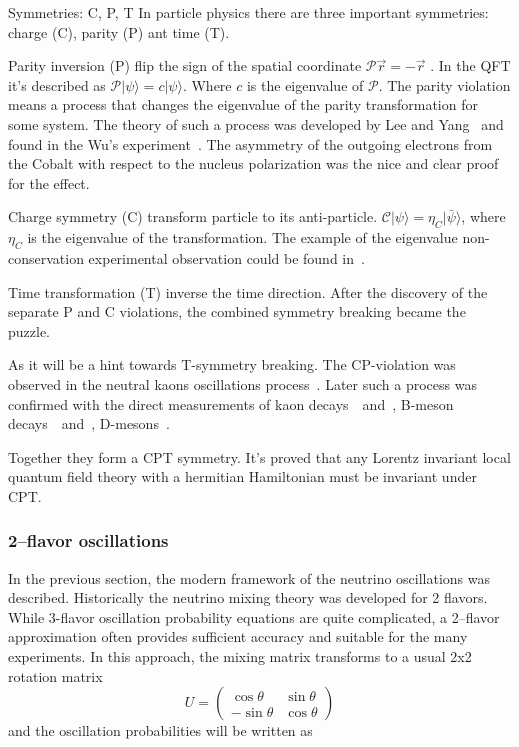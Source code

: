\documentclass[../main.tex]{subfiles}
\begin{document}
\begin{bclogo}[couleur=blue!2, arrondi=0.1, logo=\bcinfo, nobreak=true]{Symmetries: C, P, T}
In particle physics there are three important symmetries: charge (C), parity (P) ant time (T).

Parity inversion (P) flip the sign of the spatial coordinate $\mathcal{P}\overrightarrow{r}=-\overrightarrow{r}$ . In the QFT it's described as $\mathcal{P}\lvert\psi\rangle=c\lvert\psi\rangle$. Where $c$ is the eigenvalue of $\mathcal{P}$. The parity violation means a process that changes the eigenvalue of the parity transformation for some system. The theory of such a process was developed by Lee and Yang~\cite{Lee1956} and found in the Wu's experiment~\cite{Wu1957}. The asymmetry of the outgoing electrons from the Cobalt with respect to the nucleus polarization was the nice and clear proof for the effect.

Charge symmetry (C) transform particle to its anti-particle. $\mathcal{C}\lvert\psi\rangle=\eta_{C}\lvert\bar{\psi}\rangle$, where $\eta_{C}$ is the eigenvalue of the transformation. The example of the eigenvalue non-conservation experimental observation could be found in~\cite{Gormley1968}.

Time transformation (T) inverse the time direction. After the discovery of the separate P and C violations, the combined symmetry breaking became the puzzle.

As it will be a hint towards T-symmetry breaking. The CP-violation was observed in the neutral kaons oscillations process~\cite{Christenson1964}. Later such a process was confirmed with the direct measurements of kaon decays~\cite{AlaviHarati1999}~and~\cite{Fanti1999}, B-meson decays~\cite{Aubert2001}~and~\cite{Abe2001}, D-mesons~\cite{Aaij2019}.

Together they form a CPT symmetry. It's proved that any Lorentz invariant local quantum field theory with a hermitian Hamiltonian must be invariant under CPT.
\end{bclogo}

\subsubsection{2--flavor oscillations}
In the previous section, the modern framework of the neutrino oscillations was described. Historically the neutrino mixing theory was developed for 2 flavors. While 3-flavor oscillation probability equations are quite complicated, a 2--flavor approximation often provides sufficient accuracy and suitable for the many experiments. In this approach, the mixing matrix transforms to a usual 2x2 rotation matrix
\begin{equation}
U=
\begin{pmatrix}
\cos\theta    & \sin\theta     \\
-\sin\theta   & \cos\theta
\end{pmatrix}
\end{equation}
and the oscillation probabilities will be written as
\end{document}
